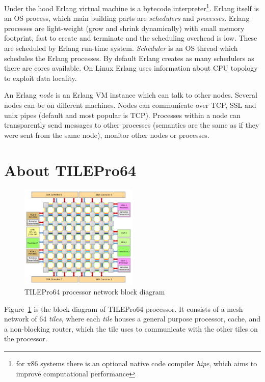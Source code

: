 \documentclass[english,11pt]{l4proj}
\begin{document}
Under the hood Erlang virtual machine is a bytecode interpreter\footnote{for x86
systems there is an optional native code compiler \emph{hipe}\cite{hipe}, which
aims to improve computational performance}. Erlang itself is an OS process,
which main building parts are {\em schedulers} and {\em processes}. Erlang
processes are light-weight (grow and shrink dynamically) with small memory
footprint, fast to create and terminate and the scheduling overhead is low.
These are scheduled by Erlang run-time system. {\em Scheduler} is an OS thread
which schedules the Erlang processes. By default Erlang creates as many
schedulers as there are cores available. On Linux Erlang uses information about
CPU topology to exploit data locality.

An Erlang {\em node} is an Erlang VM instance which can talk to other nodes.
Several nodes can be on different machines. Nodes can communicate over TCP, SSL
and unix pipes (default and most popular is TCP). Processes within a node can
transparently send messages to other processes (semantics are the same as if
they were sent from the same node), monitor other nodes or processes.

\section{About TILEPro64}
\label{sec:tilera}

\begin{figure}
    \centering
    \includegraphics[width=0.5\textwidth]{images/tile64.pdf}
    \caption{TILEPro64 processor network block diagram\cite{tilepro64-diagram}}
    \label{fig:tile64}
\end{figure}

Figure~\ref{fig:tile64} is the block diagram of TILEPro64 processor. It consists
of a mesh network of 64 {\em tiles}, where each {\em tile} houses a general
purpose processor, cache, and a non-blocking router, which the tile uses to
communicate with the other tiles on the processor.
\end{document}
